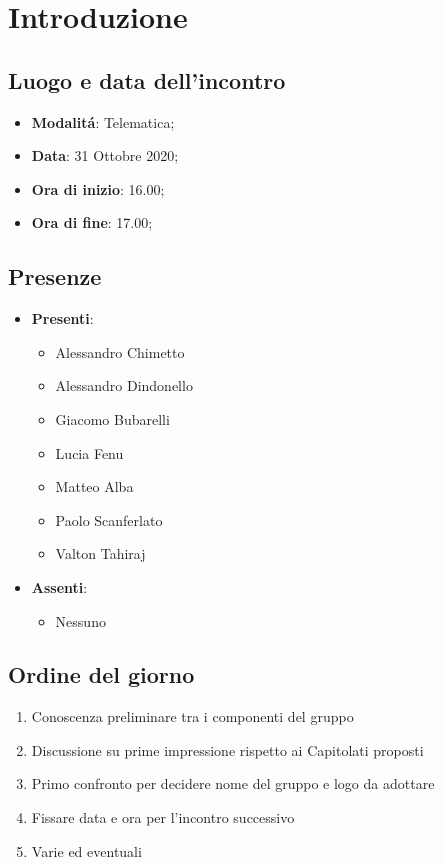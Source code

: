 \documentclass[]{article}
\begin{document}
	
	
	
	\newpage


	\section{Introduzione}
	\subsection{Luogo e data dell'incontro}
	\begin{itemize}
		\item \textbf{Modalitá}: Telematica;
		\item \textbf{Data}: 31 Ottobre 2020;
		\item \textbf{Ora di inizio}: 16.00;
		\item \textbf{Ora di fine}: 17.00;
	\end{itemize}

	\subsection{Presenze}
	\begin{itemize}
		\item \textbf{Presenti}: 
		\begin{itemize}
			\item Alessandro Chimetto
			\item Alessandro Dindonello
			\item Giacomo Bubarelli
			\item Lucia Fenu
			\item Matteo Alba
			\item Paolo Scanferlato
			\item Valton Tahiraj
		\end{itemize}
		\item \textbf{Assenti}:
		\begin{itemize}
			\item Nessuno
		\end{itemize}
	\end{itemize}


	\subsection{Ordine del giorno}
	\begin{enumerate}
		\item Conoscenza preliminare tra i componenti del gruppo
		\item Discussione su prime impressione rispetto ai Capitolati proposti
		\item Primo confronto per decidere nome del gruppo e logo da adottare
		\item Fissare data e ora per l'incontro successivo
		\item Varie ed eventuali
	\end{enumerate}
\end{document}
